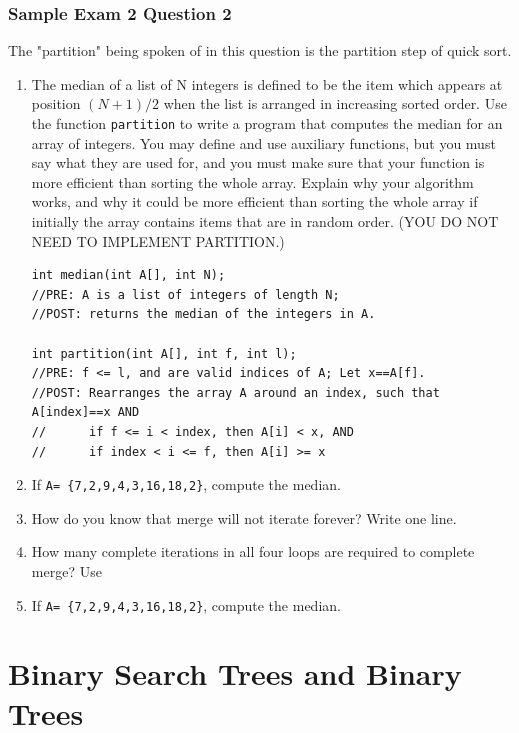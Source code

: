 \documentclass[twoside=false,DIV=14]{scrartcl}
\begin{document}
\section{Sample Exam 2 Question 2}
\begin{note}
    The "partition" being spoken of in this question is the partition step of quick sort.
\end{note}
\begin{enumerate}
\item The median of a list of N integers is defined to be the item which appears at position $(N+1)/2$ when the list is arranged in increasing sorted order. Use the function \verb+partition+ to write a program that computes the median for an array of integers. You may define and use auxiliary functions, but you must say what they are used for, and you must make sure that your function is more efficient than sorting the whole array. Explain why your algorithm works, and why it could be more efficient than sorting the whole array if initially the array contains items that are in random order. (YOU DO NOT NEED TO IMPLEMENT PARTITION.)
\begin{lstlisting}
int median(int A[], int N);
//PRE: A is a list of integers of length N;
//POST: returns the median of the integers in A.

int partition(int A[], int f, int l);
//PRE: f <= l, and are valid indices of A; Let x==A[f].
//POST: Rearranges the array A around an index, such that A[index]==x AND
//      if f <= i < index, then A[i] < x, AND
//      if index < i <= f, then A[i] >= x
\end{lstlisting}
\item If \verb+A= {7,2,9,4,3,16,18,2}+, compute the median.
\item How do you know that merge will not iterate forever? Write one line.
\item How many complete iterations in all four loops are required to complete merge? Use
\item If \verb+A= {7,2,9,4,3,16,18,2}+, compute the median.
\end{enumerate}
 

\newpage\setcounter{section}{0}
\part*{Binary Search Trees and Binary Trees}
\end{document}
